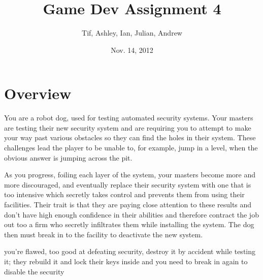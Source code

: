 \documentclass[12pt]{article}
\title{Game Dev Assignment 4}
\author{Tif, Ashley, Ian, Julian, Andrew}
\date{Nov. 14, 2012}
\begin{document}
    \maketitle
    \begin{comment}
    \section{Overview}
        you're a robot dog, trusting of your masters and they tell you they're testing you but they're actually setting you up to fail and they're testing their trap systems

        flaw is that you're very trusting and loyal, which would normally be great, but they are actually using you as a disposable robot to test traps

        more and more dead robots as you get along

        they set you up to do a test which will kill you if you do the obvious route, grumpy if you ``pass'' the test.


        alternate, they write you off as you make it through challenges, infiltrated later
    \end{comment}
    \section{Overview}
        You are a robot dog, used for testing automated security systems.  Your masters are testing their new security system and are requiring you to attempt to make your way past various obstacles so they can find the holes in their system.  These challenges lead the player to be unable to, for example, jump in a level, when the obvious answer is jumping across the pit.
        
        As you progress, foiling each layer of the system, your masters become more and more discouraged, and eventually replace their security system with one that is too intensive which secretly takes control and prevents them from using their facilities.  Their trait is that they are paying close attention to these results and don't have high enough confidence in their abilities and therefore contract the job out too a firm who secretly infiltrates them while installing the system.  The dog then must break in to the facility to deactivate the new system.

        you're flawed, too good at defeating security, destroy it by accident while testing it; they rebuild it and lock their keys inside and you need to break in again to disable the security
\end{document}
